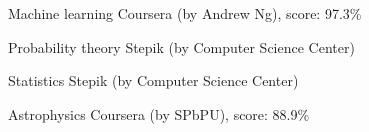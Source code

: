 

\begin{cvskills}

	\cvskill
		{Machine learning} %
		{Coursera (by Andrew Ng), score: 97.3\%} %

	\cvskill
		{Probability theory} %
		{Stepik (by Computer Science Center)} %
		
	
	\cvskill
		{Statistics} %
		{Stepik (by Computer Science Center)} %
		
	
	\cvskill
		{Astrophysics} %
		{Coursera (by SPbPU), score: 88.9\%} %


\end{cvskills}
